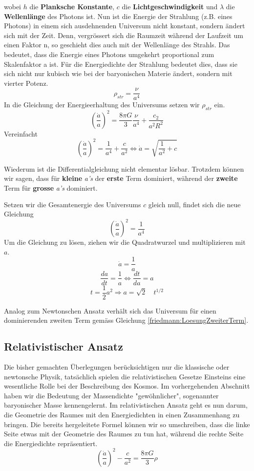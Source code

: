 \begin{refsection}
wobei $h$ die \textbf{Planksche Konstante}, $c$ die \textbf{Lichtgeschwindigkeit} und $\lambda$ die \textbf{Wellenlänge} des Photons ist.
Nun ist die Energie der Strahlung (z.B. eines Photons) in einem sich ausdehnenden Universum nicht konstant, sondern ändert sich mit der Zeit. 
Denn, vergrössert sich die Raumzeit während der Laufzeit um einen Faktor n, so geschieht dies auch mit der Wellenlänge des Strahls.
Das bedeutet, dass die Energie eines Photons umgekehrt proportional zum Skalenfaktor a ist. Für die Energiedichte der Strahlung bedeutet dies, dass sie sich nicht nur kubisch wie bei der baryonischen Materie ändert, sondern mit vierter Potenz.
\begin{equation}
\rho_{str} = \frac{\nu}{a^4}
\end{equation}
In die Gleichung der Energieerhaltung des Universums setzen wir $\rho_{str}$ ein.
\[
\left(\frac{\dot{a}}{a} \right)^2 = \frac{8 \pi G}{3} \frac{\nu}{a^4} + \frac{c_2}{a^2 R^2}
\]
Vereinfacht
\[
\left(\frac{\dot{a}}{a} \right)^2 = \frac{1}{a^4} + \frac{c}{a^2} \Leftrightarrow \dot{a} = \sqrt{\frac{1}{a^2} + c}
\]

Wiederum ist die Differentialgleichung nicht elementar lösbar. Trotzdem können wir sagen, dass für \textbf{kleine} \textit{a's} der \textbf{erste} Term dominiert, während der \textbf{zweite} Term für \textbf{grosse} \textit{a's} dominiert.


Setzen wir die Gesamtenergie des Universums $c$ gleich null, findet sich die neue Gleichung	\[\left(\frac{\dot{a}}{a} \right)^2 = \frac{1}{a^4}\]
Um die Gleichung zu lösen, ziehen wir die Quadratwurzel und multiplizieren mit $a$.
\[ \dot{a} = \frac{1}{a} \]
\[\frac{da}{dt} =\frac{1}{a} \Leftrightarrow \frac{dt}{da} = a \]
\[ t = \frac{1}{2} a^{2} \Rightarrow a = \sqrt{2} \quad t^{1/2} \]

Analog zum Newtonschen Ansatz verhält sich das Universum für einen dominierenden zweiten Term gemäss Gleichung \ref{friedmann:LoesungZweiterTerm}.

\subsection{Relativistischer Ansatz}
Die bisher gemachten Überlegungen berücksichtigen nur die klassische oder newtonsche Physik, tatsächlich spielen die relativistischen Gesetze Einsteins eine wesentliche Rolle bei der Beschreibung des Kosmos.
Im vorhergehenden Abschnitt haben wir die Bedeutung der Massendichte "gewöhnlicher", sogenannter baryonischer Masse kennengelernt. Im relativistischen Ansatz geht es nun darum, die Geometrie des Raumes mit den Energiedichten in einen Zusammenhang zu bringen.
Die bereits hergeleitete Formel können wir so umschreiben, dass die linke Seite etwas mit der Geometrie des Raumes zu tun hat, während die rechte Seite die Energiedichte repräsentiert.
\begin{equation}
\left(\frac{\dot{a}}{a} \right)^2 - \frac{c}{a^2} = \frac{8 \pi G}{3} \rho 
\label{friedmann:Einstein}
\end{equation}




\end{refsection}
